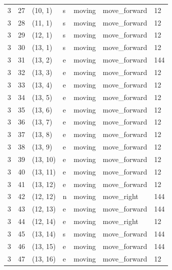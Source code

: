 \begin{table}[H]
\begin{tabular}{lllllll}
3 & 27 & (10, 1) & s & moving & move\_forward & 12 \\
3 & 28 & (11, 1) & s & moving & move\_forward & 12 \\
3 & 29 & (12, 1) & s & moving & move\_forward & 12 \\
3 & 30 & (13, 1) & s & moving & move\_forward & 12 \\
3 & 31 & (13, 2) & e & moving & move\_forward & 144 \\
3 & 32 & (13, 3) & e & moving & move\_forward & 12 \\
3 & 33 & (13, 4) & e & moving & move\_forward & 12 \\
3 & 34 & (13, 5) & e & moving & move\_forward & 12 \\
3 & 35 & (13, 6) & e & moving & move\_forward & 12 \\
3 & 36 & (13, 7) & e & moving & move\_forward & 12 \\
3 & 37 & (13, 8) & e & moving & move\_forward & 12 \\
3 & 38 & (13, 9) & e & moving & move\_forward & 12 \\
3 & 39 & (13, 10) & e & moving & move\_forward & 12 \\
3 & 40 & (13, 11) & e & moving & move\_forward & 12 \\
3 & 41 & (13, 12) & e & moving & move\_forward & 12 \\
3 & 42 & (12, 12) & n & moving & move\_right & 144 \\
3 & 43 & (12, 13) & e & moving & move\_forward & 144 \\
3 & 44 & (12, 14) & e & moving & move\_right & 12 \\
3 & 45 & (13, 14) & s & moving & move\_forward & 144 \\
3 & 46 & (13, 15) & e & moving & move\_forward & 144 \\
3 & 47 & (13, 16) & e & moving & move\_forward & 12 \\
    \bottomrule
  \end{tabular}
\end{table}
